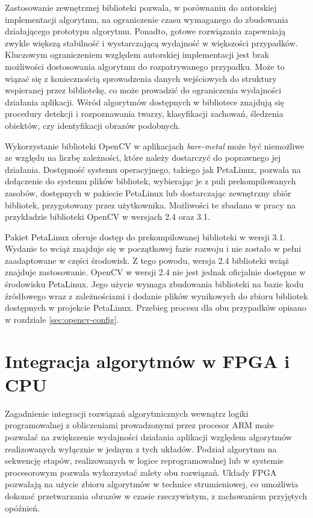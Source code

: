 Zastosowanie zewnętrznej biblioteki pozwala, w porównaniu do autorskiej implementacji algorytmu, na ograniczenie czasu wymaganego do zbudowania działającego prototypu algorytmu. 
Ponadto, gotowe rozwiązania zapewniają zwykle większą stabilność i wystarczającą wydajność w większości przypadków. 
Kluczowym ograniczeniem względem autorskiej implementacji jest brak możliwości dostosowania algorytmu do rozpatrywanego przypadku. %
Może to wiązać się z koniecznością sprowadzenia danych wejściowych do struktury wspieranej przez bibliotekę, co może prowadzić do ograniczenia wydajności działania aplikacji.
Wśród algorytmów dostępnych w bibliotece znajdują się procedury detekcji i rozpoznawania twarzy, klasyfikacji zachowań, śledzenia obiektów, czy identyfikacji obrazów podobnych. %

Wykorzystanie biblioteki OpenCV w aplikacjach \textit{bare-metal} może być niemożliwe ze względu na liczbę zależności, które należy dostarczyć do poprawnego jej działania. 
Dostępność systemu operacyjnego, takiego jak PetaLinux, pozwala na dołączenie do systemu plików bibliotek, wybierając je z puli prekompilowanych zasobów, dostępnych w pakiecie PetaLinux lub dostarczając zewnętrzny zbiór bibliotek, przygotowany przez użytkownika. 
Możliwości te zbadano w pracy na przykładzie biblioteki OpenCV w wersjach 2.4 oraz 3.1.

Pakiet PetaLinux oferuje dostęp do prekompilowanej biblioteki w wersji 3.1. 
Wydanie to wciąż znajduje się w początkowej fazie rozwoju i nie zostało w pełni zaadaptowane w części środowisk. 
Z tego powodu, wersja 2.4 biblioteki wciąż znajduje zastosowanie.
OpenCV w wersji 2.4 nie jest jednak oficjalnie dostępne w środowisku PetaLinux. 
Jego użycie wymaga zbudowania biblioteki na bazie kodu źródłowego wraz z zależnościami i dodanie plików wynikowych do zbioru bibliotek dostępnych w projekcie PetaLinux.
Przebieg procesu dla obu przypadków opisano w rozdziale \ref{sec:opencv-config}.

\section{Integracja algorytmów w FPGA i CPU}

Zagadnienie integracji rozwiązań algorytmicznych wewnątrz logiki programowalnej z obliczeniami prowadzonymi przez procesor ARM może pozwalać na zwiększenie wydajności działania aplikacji względem algorytmów realizowanych wyłącznie w jednym z tych układów.
Podział algorytmu na sekwencję etapów, realizowanych w logice reprogramowalnej lub w systemie procesorowym pozwala wykorzystać zalety obu rozwiązań. 
Układy FPGA pozwalają na użycie zbioru algorytmów w technice strumieniowej, co umożliwia dokonać przetwarzania obrazów w czasie rzeczywistym, z zachowaniem przyjętych opóźnień. %

